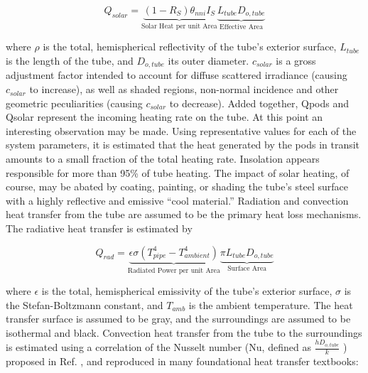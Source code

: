 \documentclass[heading.tex]{subfiles}
\begin{document}
\begin{equation}
Q_{solar} = \underbrace{ (1-R_{S})  {\theta}_{nni}  I_{S}}_\text{Solar Heat per unit Area} \underbrace{L_{tube}  D_{o,tube}}_\text{Effective Area}
\end{equation}


where $\rho$ is the total, hemispherical reflectivity of the tube’s exterior surface,
$L_{tube}$ is the length of the tube, and $D_{o,tube}$ its outer diameter.
$c_{solar}$ is a gross adjustment factor intended to account for diffuse
scattered irradiance (causing $c_{solar}$ to increase), as well as shaded regions,
non-normal incidence and other geometric peculiarities (causing $c_{solar}$ to decrease).
Added together, Qpods and Qsolar represent the incoming heating rate on the tube.
At this point an interesting observation may be made.
Using representative values for each of the system parameters,
it is estimated that the heat generated by the pods in transit
amounts to a small fraction of the total heating rate.
Insolation appears responsible for more than 95\% of tube heating.
The impact of solar heating, of course, may be abated by coating, painting,
or shading the tube’s steel surface with a highly reflective and emissive “cool material.”
Radiation and convection heat transfer from the tube are assumed
to be the primary heat loss mechanisms. The radiative heat transfer is estimated by

\begin{equation}
Q_{rad} = \underbrace{\epsilon \sigma (T_{pipe}^4 - T_{ambient}^4)}_\text{Radiated Power per unit Area}\underbrace{\pi L_{tube} D_{o,tube}}_\text{Surface Area}
\end{equation}

where $\epsilon$ is the total, hemispherical emissivity of the tube’s exterior surface,
$\sigma$ is the Stefan-Boltzmann constant, and $T_{amb}$ is the ambient temperature.
The heat transfer surface is assumed to be gray,
and the surroundings are assumed to be isothermal and black.
Convection heat transfer from the tube to the surroundings is estimated using a
correlation of the Nusselt number (Nu, defined as $\frac{hD_{o,tube}}{k}$ )
proposed in Ref. \cite{Churchill}, and reproduced in many foundational heat transfer textbooks:
\end{document}

